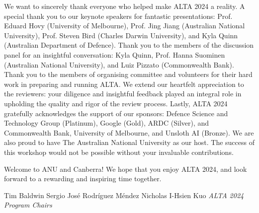 We want to sincerely thank everyone who helped make ALTA 2024 a reality. A special thank you to our keynote speakers for fantastic presentations: Prof. Eduard Hovy (University of Melbourne), Prof. Jing Jiang (Australian National University), Prof. Steven Bird (Charles Darwin University), and Kyla Quinn (Australian Department of Defence). Thank you to the members of the discussion panel for an insightful conversation: Kyla Quinn, Prof. Hanna Suominen (Australian National University), and Luiz Pizzato (Commonwealth Bank). Thank you to the members of organising committee and volunteers for their hard work in preparing and running ALTA. We extend our heartfelt appreciation to the reviewers: your diligence and insightful feedback played an integral role in upholding the quality and rigor of the review process. Lastly, ALTA 2024 gratefully acknowledges the support of our sponsors: Defence Science and Technology Group (Platinum), Google (Gold), ARDC (Silver), and Commonwealth Bank, University of Melbourne, and Unsloth AI (Bronze). We are also proud to have The Australian National University as our host. The success of this workshop would not be possible without your invaluable contributions.\newline

Welcome to ANU and Canberra! We hope that you enjoy ALTA 2024, and look forward to a rewarding and inspiring time together.\newline

\hspace*{\fill}Tim Baldwin\newline
\hspace*{\fill}Sergio José Rodríguez Méndez\newline
\hspace*{\fill}Nicholas I-Hsien Kuo\newline
\hspace*{\fill}\textit{ALTA 2024 Program Chairs}
